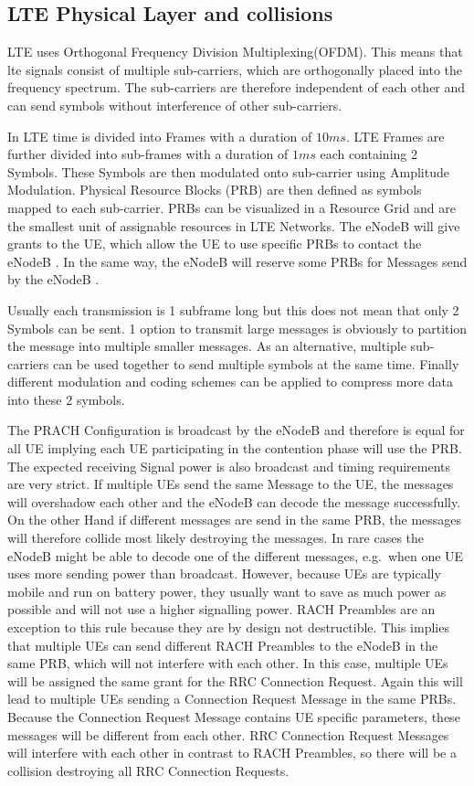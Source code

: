 \documentclass[conference]{IEEEtran}
\begin{document}
\subsection{LTE Physical Layer and collisions} \label{collision}
LTE uses Orthogonal Frequency Division Multiplexing(OFDM).
This means that lte signals consist of multiple sub-carriers, which are orthogonally placed into the frequency spectrum.
The sub-carriers are therefore independent of each other and can send symbols without interference of other sub-carriers.

In LTE time is divided into Frames with a duration of $10 ms$.
LTE Frames are further divided into sub-frames with a duration of $1 ms$ each containing 2 Symbols.
These Symbols are then modulated onto sub-carrier using Amplitude Modulation.
Physical Resource Blocks (PRB) are then defined as symbols mapped to each sub-carrier.
PRBs can be visualized in a Resource Grid and are the smallest unit of assignable resources in LTE Networks.
The eNodeB will give grants to the UE, which allow the UE to use specific PRBs to contact the eNodeB .
In the same way, the eNodeB will reserve some PRBs for Messages send by the eNodeB .

Usually each transmission is 1 subframe long but this does not mean that only 2 Symbols can be sent.
1 option to transmit large messages is obviously to partition the message into multiple smaller messages.
As an alternative, multiple sub-carriers can be used together to send multiple symbols at the same time.
Finally different modulation and coding schemes can be applied to compress more data into these 2 symbols.

The PRACH Configuration is broadcast by the eNodeB and therefore is equal for all UE implying each UE participating in the contention phase will use the PRB.
The expected receiving Signal power is also broadcast and timing requirements are very strict.
If multiple UEs send the same Message to the UE, the messages will overshadow each other and the eNodeB can decode the message successfully.
On the other Hand if different messages are send in the same PRB, the messages will therefore collide most likely destroying the messages.
In rare cases the eNodeB might be able to decode one of the different messages, e.g.\ when one UE uses more sending power than broadcast.
However, because UEs are typically mobile and run on battery power, they usually want to save as much power as possible and will not use a higher signalling power.
RACH Preambles are an exception to this rule because they are by design not destructible.
This implies that multiple UEs can send different RACH Preambles to the eNodeB in the same PRB, which will not interfere with each other.
In this case, multiple UEs will be assigned the same grant for the RRC Connection Request.
Again this will lead to multiple UEs sending a Connection Request Message in the same PRBs.
Because the Connection Request Message contains UE specific parameters, these messages will be different from each other.
RRC Connection Request Messages will interfere with each other in contrast to RACH Preambles, so there will be a collision destroying all RRC Connection Requests.
\end{document}

